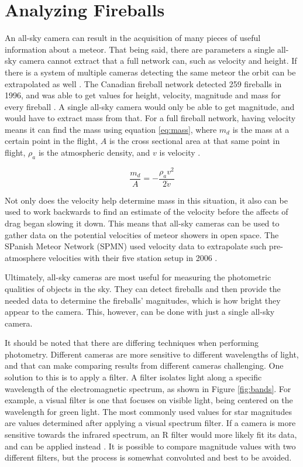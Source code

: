 \section{Analyzing Fireballs}

An all-sky camera can result in the acquisition of many pieces of useful information about a meteor. That being said, there are parameters a single all-sky camera cannot extract that a full network can, such as velocity and height. If there is a system of multiple cameras detecting the same meteor the orbit can be extrapolated as well \cite{Trigo-Rodriguez2009}. The Canadian fireball network detected 259 fireballs in 1996, and was able to get values for height, velocity, magnitude and mass for every fireball \cite{Halliday1996}. A single all-sky camera would only be able to get magnitude, and would have to extract mass from that. For a full fireball network, having velocity means it can find the mass using equation \ref{eq:mass}, where $m_d$ is the mass at a certain point in the flight, $A$ is the cross sectional area at that same point in flight, $\rho_a$ is the atmospheric density, and $v$ is velocity \cite{Halliday1996}.

\begin{equation} \label{eq:mass}
	\frac{m_d}{A} = -\frac{\rho_a v^2}{2 \dot v}
\end{equation}

Not only does the velocity help determine mass in this situation, it also can be used to work backwards to find an estimate of the velocity before the affects of drag began slowing it down. This means that all-sky cameras can be used to gather data on the potential velocities of meteor showers in open space. The SPanish Meteor Network (SPMN) used velocity data to extrapolate such pre-atmosphere velocities with their five station setup in 2006 \cite{Trigo-Rodriguez2007}. 

Ultimately, all-sky cameras are most useful for measuring the photometric qualities of objects in the sky. They can detect fireballs and then provide the needed data to determine the fireballs' magnitudes, which is how bright they appear to the camera. This, however, can be done with just a single all-sky camera.

It should be noted that there are differing techniques when performing photometry. Different cameras are more sensitive to different wavelengths of light, and that can make comparing results from different cameras challenging. One solution to this is to apply a filter. A filter isolates light along a specific wavelength of the electromagnetic spectrum, as shown in Figure \ref{fig:bands}. For example, a visual filter is one that focuses on visible light, being centered on the wavelength for green light. The most commonly used values for star magnitudes are values determined after applying a visual spectrum filter. If a camera is more sensitive towards the infrared spectrum, an R filter would more likely fit its data, and can be applied instead \cite{Suggs2014}. It is possible to compare magnitude values with two different filters, but the process is somewhat convoluted and best to be avoided.

